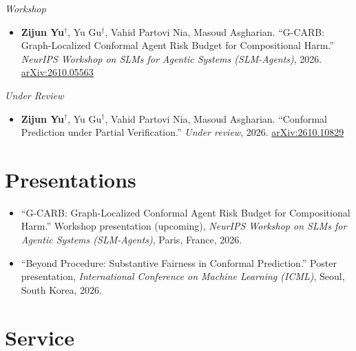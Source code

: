 \documentclass[11pt,letterpaper]{article}
\newcommand{\subhead}[1]{\vspace{0.15cm}\noindent\textit{#1}\vspace{0.1cm}}
\begin{document}
\subhead{Workshop}

\begin{itemize}[leftmargin=0.5cm]
	\item \textbf{Zijun Yu}$^\dagger$, Yu Gu$^\dagger$, Vahid Partovi Nia, Masoud Asgharian.
	      ``G-CARB: Graph-Localized Conformal Agent Risk Budget for Compositional Harm.''
	      \textit{NeurIPS Workshop on SLMs for Agentic Systems (SLM-Agents)}, 2026.
	      \href{https://arxiv.org/abs/2610.05563}{arXiv:2610.05563}
\end{itemize}

\subhead{Under Review}

\begin{itemize}[leftmargin=0.5cm]
	\item \textbf{Zijun Yu}$^\dagger$, Yu Gu$^\dagger$, Vahid Partovi Nia, Masoud Asgharian.
	      ``Conformal Prediction under Partial Verification.''
	      \textit{Under review}, 2026.
	      \href{https://arxiv.org/abs/2610.10829}{arXiv:2610.10829}
\end{itemize}

\vspace{0.2cm}


\section*{Presentations}

\begin{itemize}[leftmargin=0.5cm]
	\item ``G-CARB: Graph-Localized Conformal Agent Risk Budget for Compositional Harm.'' Workshop presentation (upcoming),
	      \textit{NeurIPS Workshop on SLMs for Agentic Systems (SLM-Agents)}, Paris, France, 2026.
	\item ``Beyond Procedure: Substantive Fairness in Conformal Prediction.'' Poster presentation,
	      \textit{International Conference on Machine Learning (ICML)}, Seoul, South Korea, 2026.
\end{itemize}

\vspace{0.2cm}


\section*{Service}
\end{document}
